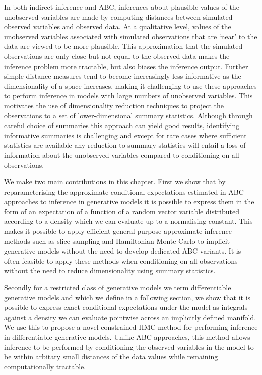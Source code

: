  
In both indirect inference and \ac{ABC}, inferences about plausible values of the unobserved variables are made by computing distances between simulated observed variables and observed data. At a qualitative level, values of the unobserved variables associated with simulated observations that are `near' to the data are viewed to be more plausible. This approximation that the simulated observations are only close but not equal to the observed data makes the inference problem more tractable, but also biases the inference output. Further simple distance measures tend to become increasingly less informative as the dimensionality of a space increases, making it challenging to use these approaches to perform inference in models with large numbers of unobserved variables. This motivates the use of dimensionality reduction techniques to project the observations to a set of lower-dimensional summary statistics. Although through careful choice of summaries this approach can yield good results, identifying informative summaries is challenging and except for rare cases where sufficient statistics are available any reduction to summary statistics will entail a loss of information about the unobserved variables compared to conditioning on all observations.

We make two main contributions in this chapter. First we show that by reparameterising the approximate conditional expectations estimated in \ac{ABC} approaches to inference in generative models it is possible to express them in the form of an expectation of a function of a random vector variable distributed according to a density which we can evaluate up to a normalising constant. This makes it possible to apply efficient general purpose approximate inference methods such as slice sampling and Hamiltonian Monte Carlo to implicit generative models without the need to develop dedicated \ac{ABC} variants. It is often feasible to apply these methods when conditioning on all observations without the need to reduce dimensionality using summary statistics.

Secondly for a restricted class of generative models we term differentiable generative models and which we define in a following section, we show that it is possible to express exact conditional expectations under the model as integrals against a density we can evaluate pointwise across an implicitly defined manifold. We use this to propose a novel constrained \ac{HMC} method for performing inference in differentiable generative models. Unlike \ac{ABC} approaches, this method allows inference to be performed by conditioning the observed variables in the model to be within arbitary small distances of the data values while remaining computationally tractable.

